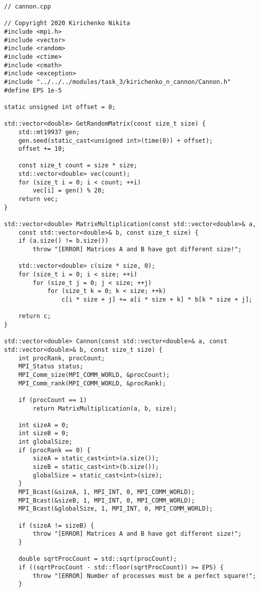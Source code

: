 \documentclass{report}
\begin{document}
\begin{lstlisting}
// cannon.cpp

// Copyright 2020 Kirichenko Nikita
#include <mpi.h>
#include <vector>
#include <random>
#include <ctime>
#include <cmath>
#include <exception>
#include "../../../modules/task_3/kirichenko_n_cannon/Cannon.h"
#define EPS 1e-5

static unsigned int offset = 0;

std::vector<double> GetRandomMatrix(const size_t size) {
    std::mt19937 gen;
    gen.seed(static_cast<unsigned int>(time(0)) + offset);
    offset += 10;

    const size_t count = size * size;
    std::vector<double> vec(count);
    for (size_t i = 0; i < count; ++i)
        vec[i] = gen() % 20;
    return vec;
}

std::vector<double> MatrixMultiplication(const std::vector<double>& a,
    const std::vector<double>& b, const size_t size) {
    if (a.size() != b.size())
        throw "[ERROR] Matrices A and B have got different size!";

    std::vector<double> c(size * size, 0);
    for (size_t i = 0; i < size; ++i)
        for (size_t j = 0; j < size; ++j)
            for (size_t k = 0; k < size; ++k)
                c[i * size + j] += a[i * size + k] * b[k * size + j];

    return c;
}

std::vector<double> Cannon(const std::vector<double>& a, const std::vector<double>& b, const size_t size) {
    int procRank, procCount;
    MPI_Status status;
    MPI_Comm_size(MPI_COMM_WORLD, &procCount);
    MPI_Comm_rank(MPI_COMM_WORLD, &procRank);

    if (procCount == 1)
        return MatrixMultiplication(a, b, size);

    int sizeA = 0;
    int sizeB = 0;
    int globalSize;
    if (procRank == 0) {
        sizeA = static_cast<int>(a.size());
        sizeB = static_cast<int>(b.size());
        globalSize = static_cast<int>(size);
    }
    MPI_Bcast(&sizeA, 1, MPI_INT, 0, MPI_COMM_WORLD);
    MPI_Bcast(&sizeB, 1, MPI_INT, 0, MPI_COMM_WORLD);
    MPI_Bcast(&globalSize, 1, MPI_INT, 0, MPI_COMM_WORLD);

    if (sizeA != sizeB) {
        throw "[ERROR] Matrices A and B have got different size!";
    }

    double sqrtProcCount = std::sqrt(procCount);
    if ((sqrtProcCount - std::floor(sqrtProcCount)) >= EPS) {
        throw "[ERROR] Number of processes must be a perfect square!";
    }


\end{lstlisting}
\end{document}
